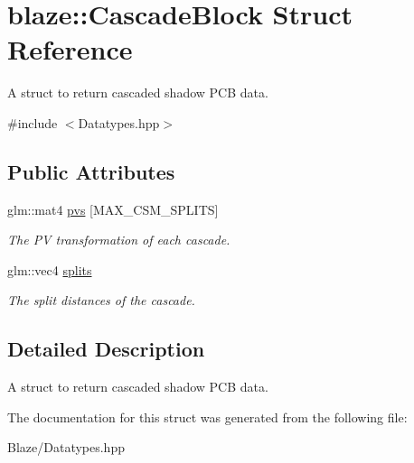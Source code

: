 \hypertarget{structblaze_1_1CascadeBlock}{}\section{blaze\+:\+:Cascade\+Block Struct Reference}
\label{structblaze_1_1CascadeBlock}


A struct to return cascaded shadow P\+CB data.  




{\ttfamily \#include $<$Datatypes.\+hpp$>$}

\subsection*{Public Attributes}
\begin{DoxyCompactItemize}
\item 
\mbox{\label{structblaze_1_1CascadeBlock_a1e537d7c7aa01881acc4e3bdb5d1bbb9}} 
glm\+::mat4 \hyperlink{structblaze_1_1CascadeBlock_a1e537d7c7aa01881acc4e3bdb5d1bbb9}{pvs} \mbox{[}M\+A\+X\+\_\+\+C\+S\+M\+\_\+\+S\+P\+L\+I\+TS\mbox{]}
\begin{DoxyCompactList}\small\item\em The PV transformation of each cascade. \end{DoxyCompactList}\item 
\mbox{\label{structblaze_1_1CascadeBlock_a2087a83919381b5b0691d9c85c88e205}} 
glm\+::vec4 \hyperlink{structblaze_1_1CascadeBlock_a2087a83919381b5b0691d9c85c88e205}{splits}
\begin{DoxyCompactList}\small\item\em The split distances of the cascade. \end{DoxyCompactList}\end{DoxyCompactItemize}


\subsection{Detailed Description}
A struct to return cascaded shadow P\+CB data. 

The documentation for this struct was generated from the following file\+:\begin{DoxyCompactItemize}
\item 
Blaze/Datatypes.\+hpp\end{DoxyCompactItemize}
